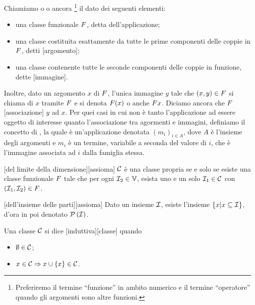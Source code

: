 \begin{Definition}
	Chiamiamo  o  o ancora \footnote{Preferiremo il termine ``funzione'' in ambito numerico e il termine ``operatore'' quando gli argomenti sono altre funzioni.} il dato dei seguenti elementi:
	\begin{itemize}
		\item una classe funzionale $F$, detta  dell'applicazione;
		\item una classe costituita esattamente da tutte le prime componenti delle coppie in $F$, detti [argomento];
		\item una classe contenente tutte le seconde componenti delle coppie in funzione, dette [immagine].
	\end{itemize}
	Inoltre, dato un argomento $x$ di $F$, l'unica immagine $y$ tale che $(x,y) \in F$ si chiama  di $x$ tramite $F$ e si denota $F(x)$ o anche $F x$. Diciamo ancora che $F$ [associazione] $y$ ad $x$. Per quei casi in cui non \`e tanto l'applicazione ad essere oggetto di interesse quanto l'associazione tra agormenti e immagini, definiamo il concetto di , la quale \`e un'applicazione denotata $(m_i)_{i \in A}$, dove $A$ \`e l'insieme degli argomenti e $m_i$ \`e un termine, variabile a seconda del valore di $i$, che \`e l'immagine associata ad $i$ dalla famiglia stessa.
\end{Definition}
\begin{Axiom}
	[del limite della dimensione][assioma] $\mathcal{C}$ \`e una classe propria se e solo se esiste una classe funzionale $F$ tale che per ogni $\mathcal{I}_2 \in \mathbb{V}$, esista uno e un solo $\mathcal{I}_1 \in \mathcal{C}$ con $(\mathcal{I}_1,\mathcal{I}_2) \in F$.
\end{Axiom}
\begin{Axiom}
	[dell'insieme delle parti][assioma] Dato un insieme $\mathcal{I}$, esiste l'insieme $\lbrace x | x \subseteq \mathcal{I} \rbrace$, d'ora in poi denotato $\mathcal{P} \left (\mathcal{I} \right )$.
\end{Axiom}
\begin{Definition}
	Una classe $\mathcal{C}$ si dice [induttiva][classe] quando
	\begin{itemize}
		\item $\emptyset \in \mathcal{C}$;
		\item $x \in \mathcal{C} \Rightarrow x \cup \lbrace x \rbrace \in \mathcal{C}$.
	\end{itemize}
\end{Definition}
